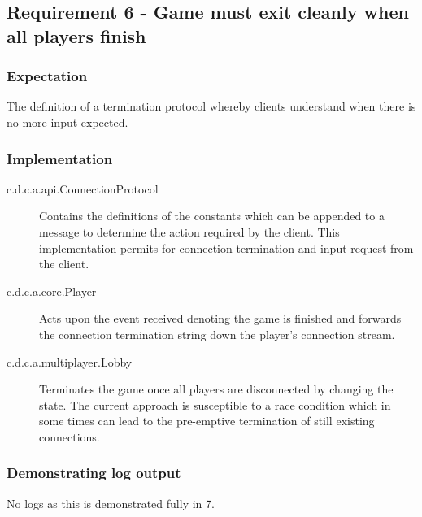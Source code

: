 \subsection{Requirement 6 - Game must exit cleanly when all players finish} 

\subsubsection{Expectation} 
The definition of a termination protocol whereby clients understand when there is no more input expected. 

\subsubsection{Implementation}

\begin{description}
	\item[c.d.c.a.api.ConnectionProtocol] Contains the definitions of the constants which can be appended to a message to determine the action required by the client. This implementation permits for connection termination and input request from the client.
	
	\item[c.d.c.a.core.Player] Acts upon the event received denoting the game is finished and forwards the connection termination string down the player's connection stream.
	
	\item[c.d.c.a.multiplayer.Lobby] Terminates the game once all players are disconnected by changing the state. The current approach is susceptible to a race condition which in some times can lead to the pre-emptive termination of still existing connections. 
\end{description}

\subsubsection{Demonstrating log output} 

No logs as this is demonstrated fully in 7.